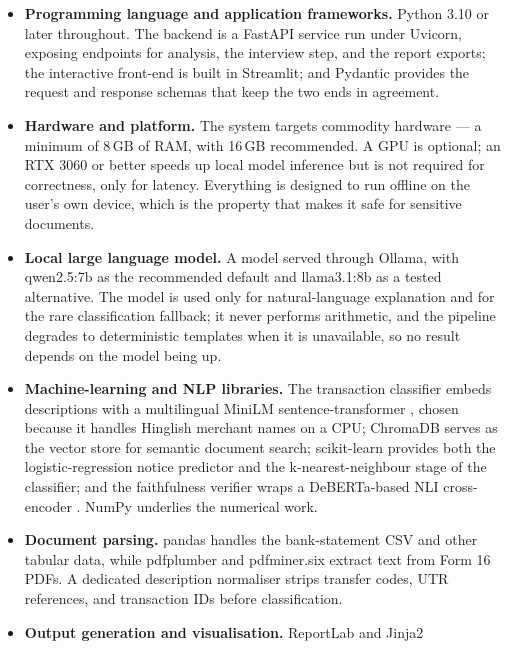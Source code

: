 \begin{itemize}
    \item \textbf{Programming language and application frameworks.} Python 3.10
          or later throughout. The backend is a FastAPI service run under
          Uvicorn, exposing endpoints for analysis, the interview step, and the
          report exports; the interactive front-end is built in Streamlit; and
          Pydantic provides the request and response schemas that keep the two
          ends in agreement.
    \item \textbf{Hardware and platform.} The system targets commodity hardware
          --- a minimum of 8\,GB of RAM, with 16\,GB recommended. A GPU is
          optional; an RTX 3060 or better speeds up local model inference but is
          not required for correctness, only for latency. Everything is designed
          to run offline on the user's own device, which is the property that
          makes it safe for sensitive documents.
    \item \textbf{Local large language model.} A model served through Ollama,
          with qwen2.5:7b as the recommended default and llama3.1:8b as a tested
          alternative. The model is used only for natural-language explanation
          and for the rare classification fallback; it never performs
          arithmetic, and the pipeline degrades to deterministic templates when
          it is unavailable, so no result depends on the model being up.
    \item \textbf{Machine-learning and NLP libraries.} The transaction classifier
          embeds descriptions with a multilingual MiniLM sentence-transformer
          \cite{ref10}, chosen because it handles Hinglish merchant names on a
          CPU; ChromaDB serves as the vector store for semantic document search;
          scikit-learn \cite{ref11} provides both the logistic-regression notice
          predictor and the k-nearest-neighbour stage of the classifier; and the
          faithfulness verifier wraps a DeBERTa-based NLI cross-encoder
          \cite{ref9}. NumPy underlies the numerical work.
    \item \textbf{Document parsing.} pandas handles the bank-statement CSV and
          other tabular data, while pdfplumber and pdfminer.six extract text from
          Form 16 PDFs. A dedicated description normaliser strips transfer codes,
          UTR references, and transaction IDs before classification.
    \item \textbf{Output generation and visualisation.} ReportLab and Jinja2

\end{itemize}

